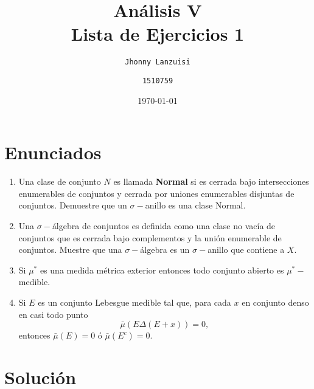 \documentclass[letterpaper,12pt]{article} %
\begin{document}
    
    \tableofcontents
    \newpage

\title{Análisis V \\\textbf{Lista de Ejercicios 1} \\ } 

\author{
  \normalsize{\texttt{Jhonny Lanzuisi}} \and
  \normalsize{\texttt{1510759}}
}
\date{\today}
\maketitle
\thispagestyle{fancy}


\section{Enunciados}

\begin{enumerate}
    \item Una clase de conjunto $N$ es llamada \textbf{Normal} si es cerrada bajo intersecciones enumerables de conjuntos y cerrada por uniones enumerables disjuntas de conjuntos. Demuestre que un $\sigma -$anillo es una clase Normal.
    \item Una $\sigma -$álgebra de conjuntos es definida como una clase no vacía de conjuntos que es cerrada bajo complementos y la unión enumerable de conjuntos. Muestre que una $\sigma -$álgebra es un $\sigma -$anillo que contiene a $X.$
    \item Si $\mu^{*}$ es una medida métrica exterior entonces todo conjunto abierto es $\mu^{*} -$medible.
    \item Si $E$ es un conjunto Lebesgue medible tal que, para cada $x$ en conjunto denso en casi todo punto $$\bar{\mu}\left ( E\Delta \left ( E+x \right ) \right )=0,$$ entonces $\bar{\mu}(E)=0$ ó $\bar{\mu}(E^{c})=0.$
\end{enumerate}

\section{Solución}

\newcommand{\sring}{$\sigma -$anillo\xspace}
\end{document}
